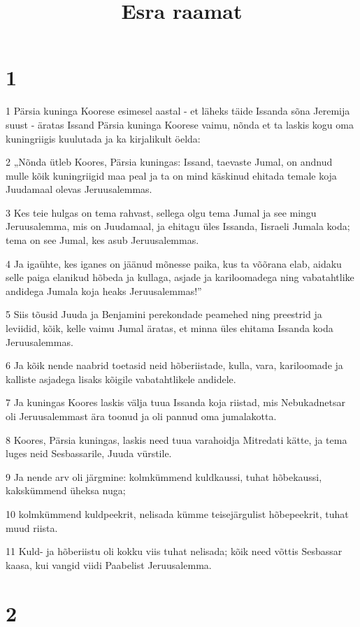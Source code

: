 

\title{Esra raamat}

\chapter{1}

\par 1 Pärsia kuninga Koorese esimesel aastal - et läheks täide Issanda sõna Jeremija suust - äratas Issand Pärsia kuninga Koorese vaimu, nõnda et ta laskis kogu oma kuningriigis kuulutada ja ka kirjalikult öelda:
\par 2 „Nõnda ütleb Koores, Pärsia kuningas: Issand, taevaste Jumal, on andnud mulle kõik kuningriigid maa peal ja ta on mind käskinud ehitada temale koja Juudamaal olevas Jeruusalemmas.
\par 3 Kes teie hulgas on tema rahvast, sellega olgu tema Jumal ja see mingu Jeruusalemma, mis on Juudamaal, ja ehitagu üles Issanda, Iisraeli Jumala koda; tema on see Jumal, kes asub Jeruusalemmas.
\par 4 Ja igaühte, kes iganes on jäänud mõnesse paika, kus ta võõrana elab, aidaku selle paiga elanikud hõbeda ja kullaga, asjade ja kariloomadega ning vabatahtlike andidega Jumala koja heaks Jeruusalemmas!”
\par 5 Siis tõusid Juuda ja Benjamini perekondade peamehed ning preestrid ja leviidid, kõik, kelle vaimu Jumal äratas, et minna üles ehitama Issanda koda Jeruusalemmas.
\par 6 Ja kõik nende naabrid toetasid neid hõberiistade, kulla, vara, kariloomade ja kalliste asjadega lisaks kõigile vabatahtlikele andidele.
\par 7 Ja kuningas Koores laskis välja tuua Issanda koja riistad, mis Nebukadnetsar oli Jeruusalemmast ära toonud ja oli pannud oma jumalakotta.
\par 8 Koores, Pärsia kuningas, laskis need tuua varahoidja Mitredati kätte, ja tema luges neid Sesbassarile, Juuda vürstile.
\par 9 Ja nende arv oli järgmine: kolmkümmend kuldkaussi, tuhat hõbekaussi, kakskümmend üheksa nuga;
\par 10 kolmkümmend kuldpeekrit, nelisada kümme teisejärgulist hõbepeekrit, tuhat muud riista.
\par 11 Kuld- ja hõberiistu oli kokku viis tuhat nelisada; kõik need võttis Sesbassar kaasa, kui vangid viidi Paabelist Jeruusalemma.

\chapter{2}

